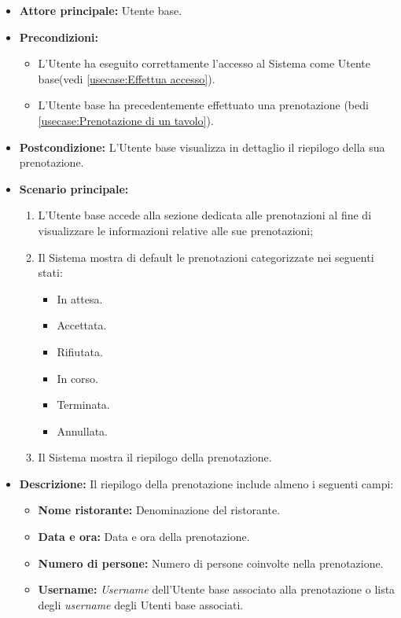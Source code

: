 \label{usecase:Visualizzazione del riepilogo prenotazione}
\begin{itemize}
	\item \textbf{Attore principale:} Utente base.

	\item \textbf{Precondizioni:}
	\begin{itemize}
		\item L'Utente ha eseguito correttamente l'accesso al Sistema come Utente base(vedi \autoref{usecase:Effettua accesso}).
		\item L'Utente base ha precedentemente effettuato una prenotazione (bedi \autoref{usecase:Prenotazione di un tavolo}).
	\end{itemize}


	\item \textbf{Postcondizione:}
	      L'Utente base visualizza in dettaglio il riepilogo della sua prenotazione.

	\item \textbf{Scenario principale:}
	      \begin{enumerate}
		      \item L'Utente base accede alla sezione dedicata alle prenotazioni al fine di visualizzare le informazioni relative alle sue prenotazioni;
		      \item Il Sistema mostra di default le prenotazioni categorizzate nei seguenti stati:
		      \begin{itemize}
                \item In attesa.
                \item Accettata.
                \item Rifiutata.
                \item In corso.
                \item Terminata.
                \item Annullata.
              \end{itemize}
		      \item Il Sistema mostra il riepilogo della prenotazione.
	      \end{enumerate}

	\item \textbf{Descrizione:}
		Il riepilogo della prenotazione include almeno i seguenti campi:
	      \begin{itemize}
		      \item \textbf{Nome ristorante:} Denominazione del ristorante.
		      \item \textbf{Data e ora:} Data e ora della prenotazione.
		      \item \textbf{Numero di persone:} Numero di persone coinvolte nella prenotazione.
		      \item \textbf{Username:} \textit{Username} dell'Utente base associato alla prenotazione o lista degli \textit{username} degli Utenti base associati.


\end{itemize}
\end{itemize}
